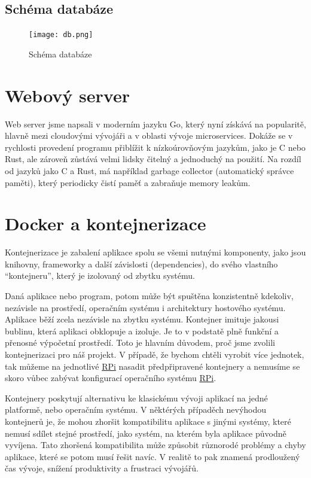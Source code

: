 \documentclass[czech,12pt,a4paper]{article}
\begin{document}
\subsection{Schéma databáze}

\begin{figure}[h]
	\centering
	\texttt{[image: db.png]}
	\caption{Schéma databáze}
\end{figure}

\clearpage

\section{Webový server} \label{secWebServer}

Web server jsme napsali v moderním jazyku Go, který nyní získává na popularitě, hlavně mezi cloudovými vývojáři a v oblasti vývoje microservices. Dokáže se v rychlosti provedení programu přiblížit k nízkoúrovňovým jazykům, jako je C nebo Rust, ale zároveň zůstává velmi lidsky čitelný a jednoduchý na použití. Na rozdíl od jazyků jako C a Rust, má například garbage collector (automatický správce paměti), který periodicky čistí paměť a zabraňuje memory leakům.

\clearpage

\section{Docker a kontejnerizace} \label{secDocker}

Kontejnerizace je zabalení aplikace spolu se všemi nutnými komponenty, jako jsou knihovny, frameworky a další závislosti (dependencies), do svého vlastního \enquote{kontejneru}, který je izolovaný od zbytku systému.

Daná aplikace nebo program, potom může být spuštěna konzistentně kdekoliv, nezávisle na prostředí, operačním systému i architektury hostového systému. Aplikace běží zcela nezávisle na zbytku systému. Kontejner imituje jakousi bublinu, která aplikaci obklopuje a izoluje. Je to v podstatě plně funkční a přenosné výpočetní prostředí. Toto je hlavním důvodem, proč jsme zvolili kontejnerizaci pro náš projekt. V případě, že bychom chtěli vyrobit více jednotek, tak můžeme na jednotlivé \underline{\ac{RPi}} nasadit předpřipravené kontejnery a nemusíme se skoro vůbec zabývat konfigurací operačního systému \underline{\ac{RPi}}.

Kontejnery poskytují alternativu ke klasickému vývoji aplikací na jedné platformě, nebo operačním systému. V něktérých případěch nevýhodou kontejnerů je, že mohou zhoršit kompatibilitu aplikace s jinými systémy, které nemusí sdílet stejné prostředí, jako systém, na kterém byla aplikace původně vyvíjena. Tato zhoršená kompatibilita může způsobit různorodé problémy a chyby aplikace, které se potom musí řešit navíc. V realitě to pak znamená prodloužený čas vývoje, snížení produktivity a frustraci vývojářů.
\end{document}
